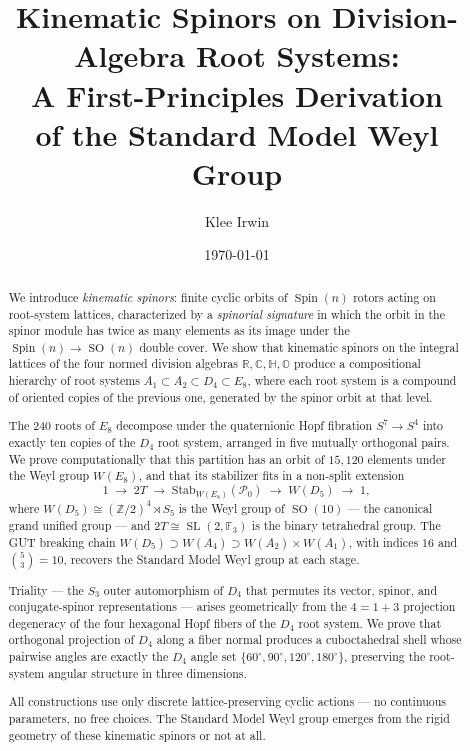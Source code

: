 \documentclass[11pt,reqno]{amsart}
\title[Kinematic Spinors on Division-Algebra Root Systems]
{Kinematic Spinors on Division-Algebra Root Systems:\\
A First-Principles Derivation\\
of the Standard Model Weyl Group}
\author{Klee Irwin}
\date{\today}
\theoremstyle{plain}
\theoremstyle{definition}
\theoremstyle{remark}
\newcommand{\R}{\mathbb{R}}
\newcommand{\Z}{\mathbb{Z}}
\newcommand{\C}{\mathbb{C}}
\newcommand{\HH}{\mathbb{H}}
\newcommand{\OO}{\mathbb{O}}
\newcommand{\F}{\mathbb{F}}
\newcommand{\Stab}{\mathrm{Stab}}
\DeclareMathOperator{\Spin}{Spin}
\DeclareMathOperator{\SO}{SO}
\DeclareMathOperator{\SL}{SL}
\begin{document}

\begin{abstract}
We introduce \emph{kinematic spinors}: finite cyclic orbits of
$\Spin(n)$ rotors acting on root-system lattices, characterized
by a \emph{spinorial signature} in which the orbit in the
spinor module has twice as many elements as its image under
the $\Spin(n) \to \SO(n)$ double cover.
We show that kinematic spinors on the integral lattices of the
four normed division algebras
$\R, \C, \HH, \OO$ produce a compositional hierarchy of root
systems $A_1 \subset A_2 \subset D_4 \subset E_8$,
where each root system is a compound of oriented copies of
the previous one, generated by the spinor orbit at that level.

The 240 roots of $E_8$ decompose under the quaternionic Hopf
fibration $S^7 \to S^4$ into exactly ten copies of the $D_4$
root system, arranged in five mutually orthogonal pairs.
We prove computationally that this partition has an orbit of
$15{,}120$ elements under the Weyl group $W(E_8)$,
and that its stabilizer fits in a non-split extension
\[
  1 \;\longrightarrow\; 2T \;\longrightarrow\;
  \Stab_{W(E_8)}(\mathcal{P}_0) \;\longrightarrow\;
  W(D_5) \;\longrightarrow\; 1,
\]
where $W(D_5)\cong (\Z/2)^4 \rtimes S_5$ is the Weyl group of
$\SO(10)$ --- the canonical grand unified group --- and
$2T \cong \SL(2,\F_3)$ is the binary tetrahedral group.
The GUT breaking chain
$W(D_5) \supset W(A_4) \supset W(A_2)\times W(A_1)$,
with indices $16$ and $\binom{5}{3}=10$,
recovers the Standard Model Weyl group at each stage.

Triality --- the $S_3$ outer automorphism of $D_4$ that permutes
its vector, spinor, and conjugate-spinor representations ---
arises geometrically from the $4 = 1 + 3$ projection degeneracy
of the four hexagonal Hopf fibers of the $D_4$ root system.
We prove that orthogonal projection of $D_4$ along a fiber
normal produces a cuboctahedral shell whose pairwise angles
are exactly the $D_4$ angle set $\{60^\circ, 90^\circ,
120^\circ, 180^\circ\}$, preserving the root-system angular
structure in three dimensions.

All constructions use only discrete lattice-preserving cyclic
actions --- no continuous parameters, no free choices.
The Standard Model Weyl group emerges from the rigid geometry
of these kinematic spinors or not at all.
\end{abstract}

\maketitle
\end{document}
